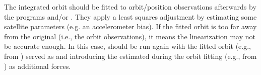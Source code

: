 The integrated orbit should be fitted to orbit/position observations afterwards by the programs
 and/or .
They apply a least squares adjustment by estimating some satellite parameters (e.g. an accelerometer bias).
If the fitted orbit is too far away from the original (i.e., the orbit observations), it means the linearization may not be
accurate enough. In this case,  should be run again with the fitted orbit 
(e.g.,  from )
served as  and introducing the  
estimated during the orbit fitting (e.g.,  from )
as additional forces.


